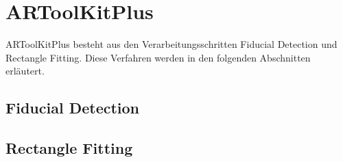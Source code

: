 \section{ARToolKitPlus} %
\label{sec:artoolkitplus}

ARToolKitPlus besteht aus den Verarbeitungsschritten Fiducial Detection und Rectangle Fitting. Diese Verfahren werden
 in den folgenden Abschnitten erläutert.

\subsection{Fiducial Detection} %
\label{sec:fiducial_detection}


\subsection{Rectangle Fitting} %
\label{sec:rectangle_fitting}


